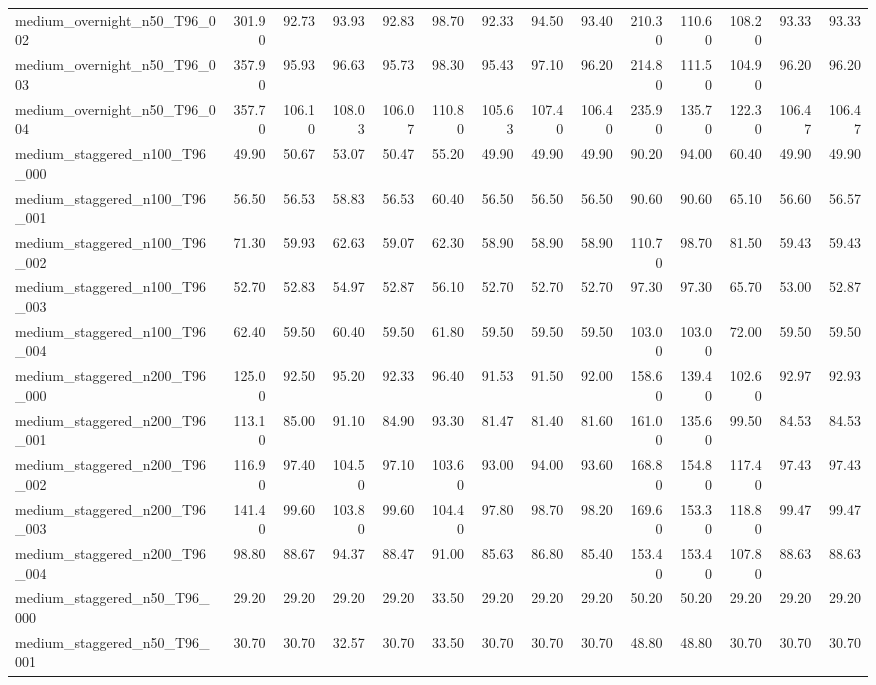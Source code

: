 \begin{table}[htbp]
\begin{tabular}{lrrrrrrrrrrrrr}
medium\_overnight\_n50\_T96\_002 & 301.90 & 92.73 & 93.93 & 92.83 & 98.70 & 92.33 & 94.50 & 93.40 & 210.30 & 110.60 & 108.20 & 93.33 & 93.33 \\
medium\_overnight\_n50\_T96\_003 & 357.90 & 95.93 & 96.63 & 95.73 & 98.30 & 95.43 & 97.10 & 96.20 & 214.80 & 111.50 & 104.90 & 96.20 & 96.20 \\
medium\_overnight\_n50\_T96\_004 & 357.70 & 106.10 & 108.03 & 106.07 & 110.80 & 105.63 & 107.40 & 106.40 & 235.90 & 135.70 & 122.30 & 106.47 & 106.47 \\
medium\_staggered\_n100\_T96\_000 & 49.90 & 50.67 & 53.07 & 50.47 & 55.20 & 49.90 & 49.90 & 49.90 & 90.20 & 94.00 & 60.40 & 49.90 & 49.90 \\
medium\_staggered\_n100\_T96\_001 & 56.50 & 56.53 & 58.83 & 56.53 & 60.40 & 56.50 & 56.50 & 56.50 & 90.60 & 90.60 & 65.10 & 56.60 & 56.57 \\
medium\_staggered\_n100\_T96\_002 & 71.30 & 59.93 & 62.63 & 59.07 & 62.30 & 58.90 & 58.90 & 58.90 & 110.70 & 98.70 & 81.50 & 59.43 & 59.43 \\
medium\_staggered\_n100\_T96\_003 & 52.70 & 52.83 & 54.97 & 52.87 & 56.10 & 52.70 & 52.70 & 52.70 & 97.30 & 97.30 & 65.70 & 53.00 & 52.87 \\
medium\_staggered\_n100\_T96\_004 & 62.40 & 59.50 & 60.40 & 59.50 & 61.80 & 59.50 & 59.50 & 59.50 & 103.00 & 103.00 & 72.00 & 59.50 & 59.50 \\
medium\_staggered\_n200\_T96\_000 & 125.00 & 92.50 & 95.20 & 92.33 & 96.40 & 91.53 & 91.50 & 92.00 & 158.60 & 139.40 & 102.60 & 92.97 & 92.93 \\
medium\_staggered\_n200\_T96\_001 & 113.10 & 85.00 & 91.10 & 84.90 & 93.30 & 81.47 & 81.40 & 81.60 & 161.00 & 135.60 & 99.50 & 84.53 & 84.53 \\
medium\_staggered\_n200\_T96\_002 & 116.90 & 97.40 & 104.50 & 97.10 & 103.60 & 93.00 & 94.00 & 93.60 & 168.80 & 154.80 & 117.40 & 97.43 & 97.43 \\
medium\_staggered\_n200\_T96\_003 & 141.40 & 99.60 & 103.80 & 99.60 & 104.40 & 97.80 & 98.70 & 98.20 & 169.60 & 153.30 & 118.80 & 99.47 & 99.47 \\
medium\_staggered\_n200\_T96\_004 & 98.80 & 88.67 & 94.37 & 88.47 & 91.00 & 85.63 & 86.80 & 85.40 & 153.40 & 153.40 & 107.80 & 88.63 & 88.63 \\
medium\_staggered\_n50\_T96\_000 & 29.20 & 29.20 & 29.20 & 29.20 & 33.50 & 29.20 & 29.20 & 29.20 & 50.20 & 50.20 & 29.20 & 29.20 & 29.20 \\
medium\_staggered\_n50\_T96\_001 & 30.70 & 30.70 & 32.57 & 30.70 & 33.50 & 30.70 & 30.70 & 30.70 & 48.80 & 48.80 & 30.70 & 30.70 & 30.70 \\

\end{tabular}
\end{table}
